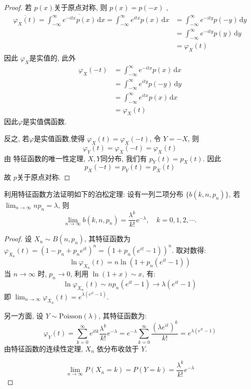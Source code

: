 \documentclass[../main.tex]{subfiles}
\begin{document}
\begin{proof}
    若 \(  p\left( x \right)   \)关于原点对称, 则 \(  p\left( x \right)= p\left( -x \right)    \)  ,  \[
    \begin{aligned}
    \overline{ \varphi _{X}\left( t \right) }= \int_{-\infty}^{\infty}   \overline{e^{-itx}p\left( x \right) }\,\mathrm{d} x= \int_{-\infty}^{\infty}e^{itx}p\left( x \right)\,\mathrm{d} x&= \int_{-\infty}^{\infty}e^{-ity}p\left( -y \right)\,\mathrm{d} y  \\ 
     &= \int_{-\infty}^{\infty}e^{-ity}p\left( y \right)\,\mathrm{d} y\\ 
      &=  \varphi _{X}\left( t \right)  
    \end{aligned}
    \]因此 \(   \varphi _{X}  \)是实值的, 此外 \[
   \begin{aligned}
     \varphi _{X}\left( -t\right)&= \int_{-\infty}^{\infty} e^{-itx}p\left( x \right)\,\mathrm{d} x \\ 
      &= \int_{-\infty}^{\infty}e^{ity}p\left( -y\right)\,\mathrm{d} y\\ 
       &= \int_{-\infty}^{\infty}e^{itx}p\left( x \right)\,\mathrm{d} x\\ 
        &=  \varphi _{X}\left( t \right)   
   \end{aligned} 
    \]因此\(   \varphi   \)是实值偶函数. 

    反之, 若\(   \varphi   \)是实值函数,使得  \(   \varphi _{X}\left( t \right)=  \varphi _{X}\left( -t \right)    \), 令 \(  Y= -X  \), 则 \[
     \varphi _{Y}\left( t \right)=  \varphi _{X}\left( -t \right)  =  \varphi _{X}\left( t \right) 
    \]由 特征函数的唯一性定理, \(  X,Y  \)同分布,    我们有 \(  p_{Y}\left( t \right)= p_{X}\left(  t \right)    \). 因此 \[
    p_{X}\left( -t \right)= p_{Y}\left( t \right)= p_{X}\left( t \right)   
    \]故 \(  p  \)关于原点对称. 
\end{proof}
\begin{exercise}{}{}
利用特征函数方法证明如下的泊松定理: 设有一列二项分布 $\{b(k, n, p_n)\}$, 若 $\lim_{n \to \infty} n p_n = \lambda$, 则
\[
\lim_{n \to \infty} b(k, n, p_n) = \frac{\lambda^k}{k!} \mathrm{e}^{-\lambda}, \quad k = 0, 1, 2, \cdots.
\]
\end{exercise}
\begin{proof}
    设 \( X_n \sim B(n, p_n) \), 其特征函数为 \( \varphi_{X_n}(t) = (1 - p_n + p_n e^{it})^n = (1 + p_n(e^{it}-1))^n \).
    取对数得:
    \[ \ln \varphi_{X_n}(t) = n \ln(1 + p_n(e^{it}-1)) \]
    当 \( n \to \infty \) 时, \( p_n \to 0 \), 利用 \( \ln(1+x) \sim x \), 有:
    \[ \ln \varphi_{X_n}(t) \sim n p_n (e^{it}-1) \to \lambda(e^{it}-1) \]
    即 \( \lim_{n\to\infty} \varphi_{X_n}(t) = e^{\lambda(e^{it}-1)} \).
    
    另一方面, 设 \( Y \sim \mathrm{Poisson}(\lambda) \), 其特征函数为:
    \[ \varphi_Y(t) = \sum_{k=0}^\infty e^{itk} \frac{\lambda^k}{k!}e^{-\lambda} = e^{-\lambda} \sum_{k=0}^\infty \frac{(\lambda e^{it})^k}{k!} = e^{\lambda(e^{it}-1)} \]
    由特征函数的连续性定理, \( X_n \) 依分布收敛于 \( Y \).
   
    \[ \lim_{n \to \infty} P(X_n = k) = P(Y = k) = \frac{\lambda^k}{k!} e^{-\lambda} \]
\end{proof}
\end{document}
